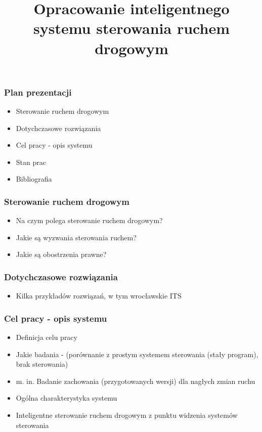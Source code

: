 \documentclass[17pt]{beamer}
\author{}
\title{Opracowanie inteligentnego systemu sterowania ruchem drogowym}
\subtitle{}
\date{}
\institute{autor: inż. Przemysław Rokosz\\\vspace{\baselineskip}promotor: dr inż. Grzegorz Filcek}
\begin{document}
\begin{frame}[plain,t]
 \maketitle
\end{frame}

\begin{frame}[shrink=5]
 \frametitle{\vspace{22px}Plan prezentacji}
 \begin{itemize}
  \item{Sterowanie ruchem drogowym}
  \item{Dotychczasowe rozwiązania}
  \item{Cel pracy - opis systemu}
  \item{Stan prac}
  \item{Bibliografia}
 \end{itemize}
\end{frame}

\begin{frame}[shrink=5]
 \frametitle{\vspace{22px}Sterowanie ruchem drogowym}
 \begin{itemize}
  \item{Na czym polega sterowanie ruchem drogowym?}
  \item{Jakie są wyzwania sterowania ruchem?}
  \item{Jakie są obostrzenia prawne?}
 \end{itemize}
\end{frame}

\begin{frame}[shrink=5]
 \frametitle{\vspace{22px}Dotychczasowe rozwiązania}
 \begin{itemize}
  \item{Kilka przykładów rozwiązań, w tym wrocławskie ITS}
 \end{itemize}
\end{frame}

\begin{frame}[shrink=5]
 \frametitle{\vspace{22px}Cel pracy - opis systemu}
 \begin{itemize}
  \item{Definicja celu pracy}
  \item{Jakie badania - (porównanie z prostym systemem sterowania (stały program), brak sterowania)}
  \item{m. in. Badanie zachowania (przygotowanych wersji) dla nagłych zmian ruchu}
  \item{Ogólna charakterystyka systemu}
  \item{Inteligentne sterowanie ruchem drogowym z punktu widzenia systemów sterowania}
 \end{itemize}
\end{frame}
\end{document}
